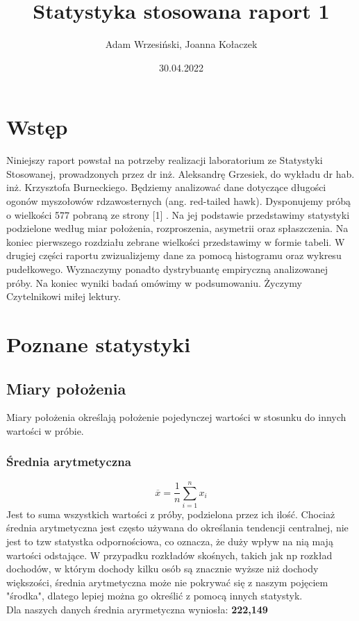 \documentclass{article}
\title{Statystyka stosowana raport 1}
\author{Adam Wrzesiński, Joanna Kołaczek}
\date{30.04.2022}
\theoremstyle{break}
\begin{document}
	\maketitle
	\tableofcontents
	\clearpage
	\section{Wstęp}
	
	Niniejszy raport powstał na potrzeby realizacji laboratorium ze Statystyki Stosowanej, prowadzonych przez dr inż. Aleksandrę Grzesiek, do wykładu dr hab. inż. Krzysztofa Burneckiego. Będziemy analizować dane dotyczące długości ogonów myszołowów rdzawosternych (ang. red-tailed hawk). Dysponujemy próbą o wielkości 577 pobraną ze strony [1] . Na jej podstawie przedstawimy statystyki podzielone według miar położenia, rozproszenia, asymetrii oraz spłaszczenia. Na koniec pierwszego rozdziału zebrane wielkości przedstawimy w formie tabeli.  W drugiej części raportu zwizualizjemy dane za pomocą histogramu oraz wykresu pudełkowego. Wyznaczymy ponadto dystrybuantę empiryczną analizowanej próby. Na koniec wyniki badań omówimy w podsumowaniu. Życzymy Czytelnikowi miłej lektury.
	
	\section{Poznane statystyki}
	\subsection{Miary położenia}
	
	Miary położenia określają położenie pojedynczej wartości w stosunku do innych wartości w próbie. 
	
	\subsubsection{Średnia arytmetyczna}
	$$\overline{x}=\frac{1}{n}\sum\limits_{i=1}^{n}x_i$$
	Jest to suma wszystkich wartości z próby, podzielona przez ich ilość. Chociaż średnia arytmetyczna jest często używana do określania tendencji centralnej, nie jest to tzw statystka odpornościowa, co oznacza, że duży wpływ na nią mają wartości odstające. W przypadku rozkładów skośnych, takich jak np rozkład dochodów, w którym dochody kilku osób są znacznie wyższe niż dochody większości, średnia arytmetyczna może nie pokrywać się z naszym pojęciem "środka", dlatego lepiej można go określić z pomocą innych statystyk.\\
	Dla naszych danych średnia aryrmetyczna wyniosła: \textbf{222,149}
\end{document}

